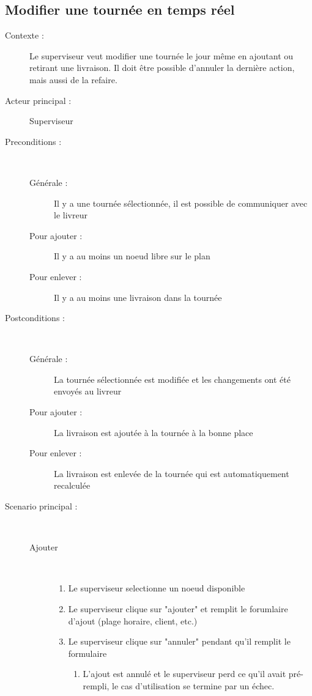 \subsection{Modifier une tourn\'ee en temps r\'eel}
\begin{description}
    \item[Contexte :] Le superviseur veut modifier une tourn\'ee le jour m\^eme en ajoutant ou retirant une livraison. Il doit \^etre possible d'annuler la derni\`ere action, mais aussi de la refaire.
    \item[Acteur principal :] Superviseur
    \item[Preconditions :] ~
    \begin{description}
        \item[G\'en\'erale :] Il y a une tourn\'ee s\'electionn\'ee, il est possible de communiquer avec le livreur
        \item[Pour ajouter :] Il y a au moins un noeud libre sur le plan
        \item[Pour enlever :] Il y a au moins une livraison dans la tourn\'ee
    \end{description}
    \item[Postconditions :] ~
    \begin{description}
        \item[G\'en\'erale :] La tourn\'ee s\'electionn\'ee est modifi\'ee et les changements ont \'et\'e envoy\'es au livreur
        \item[Pour ajouter :] La livraison est ajout\'ee \`a la tourn\'ee \`a la bonne place
        \item[Pour enlever :] La livraison est enlev\'ee de la tourn\'ee qui est automatiquement recalcul\'ee
    \end{description}
    \item[Scenario principal :] ~
    \begin{description}
        \item[Ajouter] ~
        \begin{enumerate}
            \item Le superviseur selectionne un noeud disponible
            \item Le superviseur clique sur "ajouter" et remplit le forumlaire d'ajout (plage horaire, client, etc.)
            \item Le superviseur clique sur "annuler" pendant qu'il remplit le formulaire
            \begin{enumerate}
                \item L'ajout est annul\'e et le superviseur perd ce qu'il avait pr\'e-rempli, le cas d'utilisation se termine par un \'echec.

\end{enumerate}
\end{enumerate}
\end{description}
\end{description}
